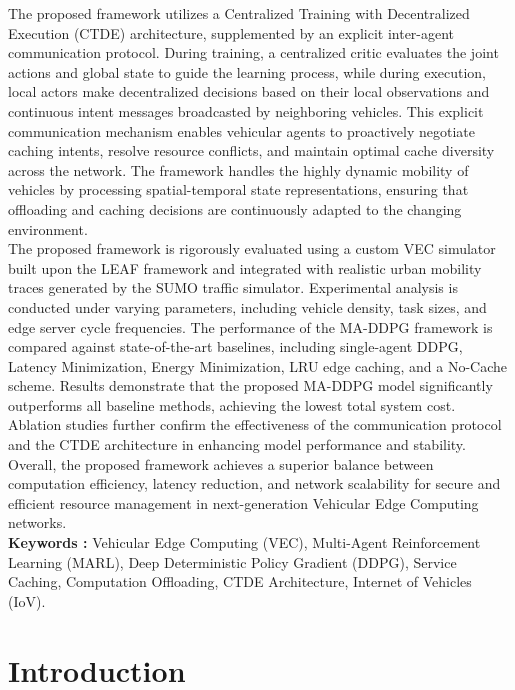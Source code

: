 \documentclass[12pt,a4paper]{report}
\begin{document}
The proposed framework utilizes a Centralized Training with Decentralized Execution (CTDE) architecture, supplemented by an explicit inter-agent communication protocol. During training, a centralized critic evaluates the joint actions and global state to guide the learning process, while during execution, local actors make decentralized decisions based on their local observations and continuous intent messages broadcasted by neighboring vehicles. This explicit communication mechanism enables vehicular agents to proactively negotiate caching intents, resolve resource conflicts, and maintain optimal cache diversity across the network. The framework handles the highly dynamic mobility of vehicles by processing spatial-temporal state representations, ensuring that offloading and caching decisions are continuously adapted to the changing environment.\\

The proposed framework is rigorously evaluated using a custom VEC simulator built upon the LEAF framework and integrated with realistic urban mobility traces generated by the SUMO traffic simulator. Experimental analysis is conducted under varying parameters, including vehicle density, task sizes, and edge server cycle frequencies. The performance of the MA-DDPG framework is compared against state-of-the-art baselines, including single-agent DDPG, Latency Minimization, Energy Minimization, LRU edge caching, and a No-Cache scheme. Results demonstrate that the proposed MA-DDPG model significantly outperforms all baseline methods, achieving the lowest total system cost. Ablation studies further confirm the effectiveness of the communication protocol and the CTDE architecture in enhancing model performance and stability. Overall, the proposed framework achieves a superior balance between computation efficiency, latency reduction, and network scalability for secure and efficient resource management in next-generation Vehicular Edge Computing networks.\\

\noindent
\textbf{Keywords :} Vehicular Edge Computing (VEC), Multi-Agent Reinforcement Learning (MARL), Deep Deterministic Policy Gradient (DDPG), Service Caching, Computation Offloading, CTDE Architecture, Internet of Vehicles (IoV).

\newpage

\chapter{Introduction}
\end{document}
